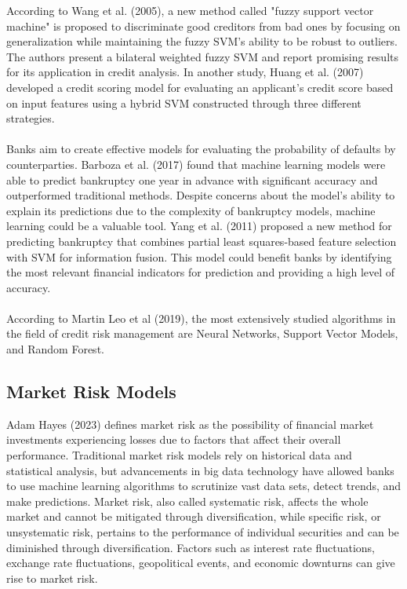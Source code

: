 According to Wang et al. (2005), a new method called "fuzzy support vector machine" is proposed to discriminate
good creditors from bad ones by focusing on generalization while maintaining the fuzzy SVM's ability to be robust
to outliers. The authors present a bilateral weighted fuzzy SVM and report promising results for its application
in credit analysis. In another study, Huang et al. (2007) developed a credit scoring model for evaluating an
applicant's credit score based on input features using a hybrid SVM constructed through three different
strategies.\\\\
Banks aim to create effective models for evaluating the probability of defaults by counterparties.
Barboza et al. (2017) found that machine learning models were able to predict bankruptcy one year in advance with
significant accuracy and outperformed traditional methods. Despite concerns about the model’s ability to explain
its predictions due to the complexity of bankruptcy models, machine learning could be a valuable tool.
Yang et al. (2011) proposed a new method for predicting bankruptcy that combines partial least squares-based
feature selection with SVM for information fusion. This model could benefit banks by identifying the most
relevant financial indicators for prediction and providing a high level of accuracy.\\\\
According to Martin Leo et al (2019), the most extensively studied algorithms in the field of credit risk management
are Neural Networks, Support Vector Models, and Random Forest.


\subsection{Market Risk Models}
Adam Hayes (2023) defines market risk as the possibility of financial market investments experiencing losses due 
to factors that affect their overall performance. Traditional market risk models rely on historical data and 
statistical analysis, but advancements in big data technology have allowed banks to use machine learning 
algorithms to scrutinize vast data sets, detect trends, and make predictions. Market risk, also called 
systematic risk, affects the whole market and cannot be mitigated through diversification, while specific 
risk, or unsystematic risk, pertains to the performance of individual securities and can be diminished 
through diversification. Factors such as interest rate fluctuations, exchange rate fluctuations, geopolitical 
events, and economic downturns can give rise to market risk.

